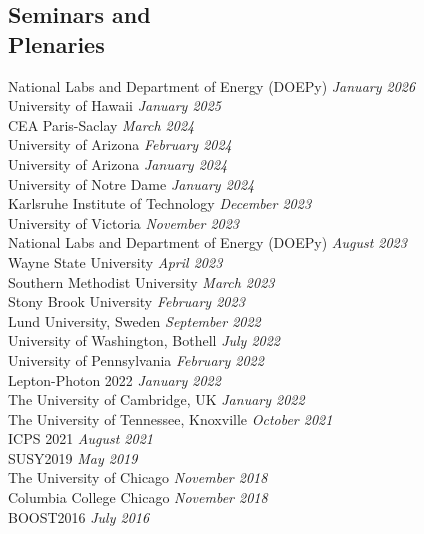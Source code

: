 \documentclass[margin,line]{resume}
\let\origsection\section%
\let\section\subsection%
\let\section\origsection%
\begin{document}
\begin{resume}
\section{\mysidestyle Seminars and\\Plenaries}
National Labs and Department of Energy (DOEPy) \hfill \textsl{January 2026}\\
University of Hawaii \hfill \textsl{January 2025}\\
CEA Paris-Saclay \hfill \textsl{March 2024}\\
University of Arizona \hfill \textsl{February 2024}\\
University of Arizona \hfill \textsl{January 2024}\\
University of Notre Dame \hfill \textsl{January 2024}\\
Karlsruhe Institute of Technology \hfill \textsl{December 2023}\\
University of Victoria \hfill \textsl{November 2023}\\
National Labs and Department of Energy (DOEPy) \hfill \textsl{August 2023}\\
Wayne State University \hfill \textsl{April 2023}\\
Southern Methodist University \hfill \textsl{March 2023}\\
Stony Brook University \hfill \textsl{February 2023}\\
Lund University, Sweden \hfill \textsl{September 2022}\\
University of Washington, Bothell \hfill \textsl{July 2022}\\
University of Pennsylvania \hfill \textsl{February 2022}\\
Lepton-Photon 2022 \hfill \textsl{January 2022}\\
The University of Cambridge, UK \hfill \textsl{January 2022}\\
The University of Tennessee, Knoxville \hfill \textsl{October 2021}\\
ICPS 2021 \hfill \textsl{August 2021}\\
SUSY2019 \hfill \textsl{May 2019}\\
The University of Chicago \hfill \textsl{November 2018}\\
Columbia College Chicago \hfill \textsl{November 2018}\\
BOOST2016 \hfill \textsl{July 2016}



\end{resume}
\end{document}
